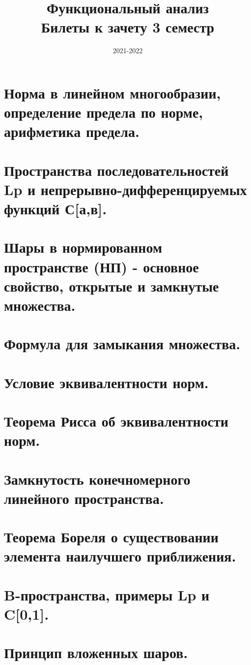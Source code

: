 \documentclass{article}
\title{Функциональный анализ\\ Билеты к зачету 3 семестр}
\date{2021-2022}
\author{}
\begin{document}
\maketitle

\begin{sloppypar}
\tableofcontents

\newpage
\section{Норма в линейном многообразии, определение предела по норме, арифметика предела.}

\section{Пространства последовательностей Lp и непрерывно-дифференцируемых функций С[а,в].}

\section{Шары в нормированном пространстве (НП) - основное свойство, открытые и замкнутые множества.}

\section{Формула для замыкания множества.}

\section{Условие эквивалентности норм.}

\section{Теорема Рисса об эквивалентности норм.}

\section{Замкнутость конечномерного линейного пространства.}

\section{Теорема Бореля о существовании элемента наилучшего приближения.}

\section{B-пространства, примеры Lp и C[0,1].}

\section{Принцип вложенных шаров.}


\end{sloppypar}
\end{document}
